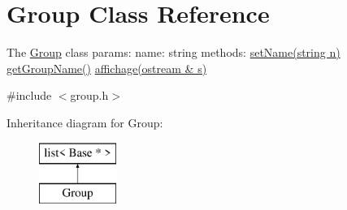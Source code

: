 \hypertarget{classGroup}{\section{Group Class Reference}
\label{classGroup}
}


The \hyperlink{classGroup}{Group} class params\-: name\-: string methods\-: \hyperlink{classGroup_a0c38a3d735a6bef446c1dceb27866408}{set\-Name(string n)} \hyperlink{classGroup_a030dc7b666d67a51926d6236c1707f14}{get\-Group\-Name()} \hyperlink{classGroup_ae5bd44de2616138eacca19189be39d3c}{affichage(ostream \& s)}  




{\ttfamily \#include $<$group.\-h$>$}

Inheritance diagram for Group\-:\begin{figure}[H]
\begin{center}
\leavevmode
\includegraphics[height=2.000000cm]{classGroup}
\end{center}
\end{figure}
